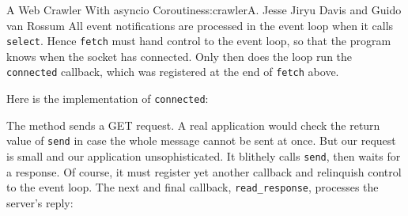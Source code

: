 \begin{aosachapter}{A Web Crawler With asyncio Coroutines}{s:crawler}{A. Jesse Jiryu Davis and Guido van Rossum}
All event notifications are processed in the event loop when it calls
\texttt{select}. Hence \texttt{fetch} must hand control to the event
loop, so that the program knows when the socket has connected. Only then
does the loop run the \texttt{connected} callback, which was registered
at the end of \texttt{fetch} above.

Here is the implementation of \texttt{connected}:

\begin{Shaded}
\begin{Highlighting}[]
     
        \NormalTok{(}\NormalTok{)}
        \NormalTok{))}
        
\end{Highlighting}
\end{Shaded}

The method sends a GET request. A real application would check the
return value of \texttt{send} in case the whole message cannot be sent
at once. But our request is small and our application unsophisticated.
It blithely calls \texttt{send}, then waits for a response. Of course,
it must register yet another callback and relinquish control to the
event loop. The next and final callback, \texttt{read\_response},
processes the server's reply:

\begin{Shaded}
\begin{Highlighting}[]
     
         

        \NormalTok{)  }
         
        \NormalTok{:}
            

\end{Highlighting}
\end{Shaded}
\end{aosachapter}
